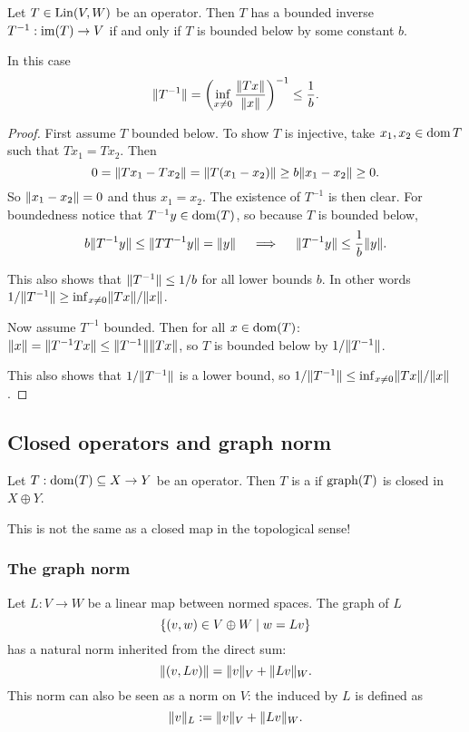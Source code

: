 \begin{proposition} \label{boundedBelow}
Let $T\in \operatorname{Lin}(V, W)$ be an operator. Then $T$ has a bounded inverse $T^{-1}: \operatorname{im}(T)\to V$ \textup{if and only if} $T$ is bounded below by some constant $b$.

In this case
\[ \displaystyle\lVert T^{-1}\rVert = \left(\inf_{x\neq 0}\frac{\lVert Tx\rVert}{\lVert x\rVert}\right)^{-1} \leq \frac{1}{b}. \]
\end{proposition}
\begin{proof}
First assume $T$ bounded below.
To show $T$ is injective, take $x_1,x_2\in \operatorname{dom} T$ such that $Tx_1 = Tx_2$. Then
\[ 0 = \lVert Tx_1 - Tx_2\rVert = \lVert T(x_1 - x_2)\rVert \geq b\lVert x_1 - x_2\rVert \geq 0. \]
So $\lVert x_1 - x_2\rVert = 0$ and thus $x_1=x_2$.
The existence of $T^{-1}$ is then clear. For boundedness notice that $T^{-1}y \in \operatorname{dom}(T)$, so because $T$ is bounded below,
\[ b\lVert T^{-1}y\rVert \leq \lVert TT^{-1}y\rVert = \lVert y\rVert \quad\implies\quad \lVert T^{-1}y\rVert \leq \frac{1}{b}\lVert y\rVert. \]

This also shows that $\lVert T^{-1}\rVert \leq 1/b$ for all lower bounds $b$. In other words $1/\lVert T^{-1}\rVert \geq \inf_{x\neq 0}\lVert Tx\rVert/\lVert x\rVert$.

Now assume $T^{-1}$ bounded. Then for all $x\in\operatorname{dom}(T)$: $\lVert x\rVert = \lVert T^{-1}Tx\rVert \leq \lVert T^{-1}\rVert\lVert Tx\rVert$, so $T$ is bounded below by $1/\lVert T^{-1}\rVert$.

This also shows that $1/\lVert T^{-1}\rVert$ is a lower bound, so $1/\lVert T^{-1}\rVert \leq \inf_{x\neq 0}\lVert Tx\rVert/\lVert x\rVert$.
\end{proof}



\subsection{Closed operators and graph norm}
\begin{definition}
Let $T:\operatorname{dom}(T)\subseteq X\to Y$ be an operator. Then $T$ is a  if $\operatorname{graph}(T)$ is closed in $X\oplus Y$.
\end{definition}
This is not the same as a closed map in the topological sense!

\subsubsection{The graph norm}
Let $L:V\to W$ be a linear map between normed spaces. The graph of $L$
\[ \setbuilder{(v,w)\in V\oplus W}{w = Lv} \]
has a natural norm inherited from the direct sum:
\[ \lVert(v,Lv)\rVert = \lVert v\rVert_V + \lVert Lv\rVert_W. \]
This norm can also be seen as a norm on $V$: the  induced by $L$ is defined as
\[ \lVert v\rVert_L := \lVert v\rVert_V + \lVert Lv\rVert_W. \]

